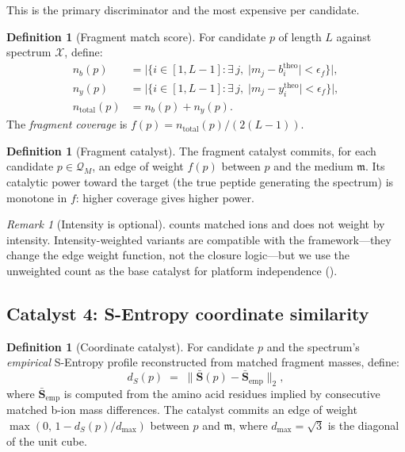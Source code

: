 \documentclass[11pt,a4paper]{article}
\theoremstyle{definition}
\newtheorem{definition}[theorem]{Definition}
\theoremstyle{remark}
\newtheorem{remark}[theorem]{Remark}
\newcommand{\med}{\mathfrak{m}}
\newcommand{\Scoord}{\mathbf{S}}
\newcommand{\Pep}{\mathcal{Q}}
\newcommand{\Spec}{\mathcal{X}}
\begin{document}
This is the primary discriminator and the most expensive per candidate.

\begin{definition}[Fragment match score]
\label{def:frag}
For candidate $p$ of length $L$ against spectrum $\Spec$, define:
\begin{align}
  n_b(p) &= |\{i\in[1,L-1] : \exists\,j,\;
  |m_j-b_i^{\mathrm{theo}}|<\epsilon_f\}|,\\[2pt]
  n_y(p) &= |\{i\in[1,L-1] : \exists\,j,\;
  |m_j-y_i^{\mathrm{theo}}|<\epsilon_f\}|,\\[2pt]
  n_{\mathrm{total}}(p) &= n_b(p)+n_y(p).
\end{align}
The \emph{fragment coverage} is $f(p)=n_{\mathrm{total}}(p)/(2(L-1))$.
\end{definition}

\begin{definition}[Fragment catalyst]
\label{def:frag-catalyst}
The fragment catalyst commits, for each candidate $p\in\Pep_M$, an edge
of weight $f(p)$ between $p$ and the medium $\med$. Its catalytic power
toward the target (the true peptide generating the spectrum) is
monotone in $f$: higher coverage gives higher power.
\end{definition}

\begin{remark}[Intensity is optional]
 counts matched ions and does not weight by intensity.
Intensity-weighted variants are compatible with the framework---they
change the edge weight function, not the closure logic---but we use the
unweighted count as the base catalyst for platform independence
().
\end{remark}

\subsection{Catalyst 4: S-Entropy coordinate similarity}

\begin{definition}[Coordinate catalyst]
\label{def:coord-catalyst}
For candidate $p$ and the spectrum's \emph{empirical} S-Entropy
profile reconstructed from matched fragment masses, define:
\[
  d_S(p) \;=\; \|\bar{\Scoord}(p)-\bar{\Scoord}_{\mathrm{emp}}\|_2,
\]
where $\bar{\Scoord}_{\mathrm{emp}}$ is computed from the amino acid
residues implied by consecutive matched b-ion mass differences. The
catalyst commits an edge of weight $\max(0,\,1-d_S(p)/d_{\max})$
between $p$ and $\med$, where $d_{\max}=\sqrt{3}$ is the diagonal of
the unit cube.
\end{definition}
\end{document}
